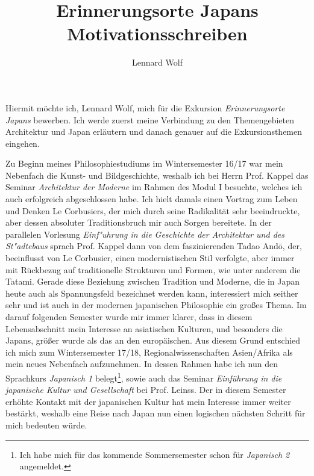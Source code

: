 \documentclass[a4paper]{article}
\date{\vspace{-2ex}}
\begin{document}
\title{Erinnerungsorte Japans\\Motivationsschreiben\vspace{-0.5ex}}

\author{Lennard Wolf}

\maketitle

\noindent Hiermit möchte ich, Lennard Wolf, mich für die Exkursion \emph{Erinnerungsorte Japans} bewerben. Ich werde zuerst meine Verbindung zu den Themengebieten Architektur und Japan erläutern und danach genauer auf die Exkursionsthemen eingehen. 

Zu Beginn meines Philosophiestudiums im Wintersemester 16/17 war mein Nebenfach die Kunst- und Bildgeschichte, weshalb ich bei Herrn Prof. Kappel das Seminar \emph{Architektur der Moderne} im Rahmen des Modul I besuchte, welches ich auch erfolgreich abgeschlossen habe. Ich hielt damals einen Vortrag zum Leben und Denken Le Corbusiers, der mich durch seine Radikalität sehr beeindruckte, aber dessen absoluter Traditionsbruch mir auch Sorgen bereitete. In der parallelen Vorlesung \emph{Einf"uhrung in die Geschichte der Architektur und des St"adtebaus} sprach Prof. Kappel dann von dem faszinierenden Tadao Andō, der, beeinflusst von Le Corbusier, einen modernistischen Stil verfolgte, aber immer mit Rückbezug auf traditionelle Strukturen und Formen, wie unter anderem die Tatami. Gerade diese Beziehung zwischen Tradition und Moderne, die in Japan heute auch als Spannungsfeld bezeichnet werden kann, interessiert mich seither sehr und ist auch in der modernen japanischen Philosophie ein großes Thema. Im darauf folgenden Semester wurde mir immer klarer, dass in diesem Lebensabschnitt mein Interesse an asiatischen Kulturen, und besonders die Japans, größer wurde als das an den europäischen. Aus diesem Grund entschied ich mich zum Wintersemester 17/18, Regionalwissenschaften Asien/Afrika als mein neues Nebenfach aufzunehmen. In dessen Rahmen habe ich nun den Sprachkurs \emph{Japanisch 1} belegt\footnote{Ich habe mich für das kommende Sommersemester schon für \emph{Japanisch 2} angemeldet.}, sowie auch das Seminar \emph{Einführung in die japanische Kultur und Gesellschaft} bei Prof. Leinss. Der in diesem Semester erhöhte Kontakt mit der japanischen Kultur hat mein Interesse immer weiter bestärkt, weshalb eine Reise nach Japan nun einen logischen nächsten Schritt für mich bedeuten würde.
\end{document}
